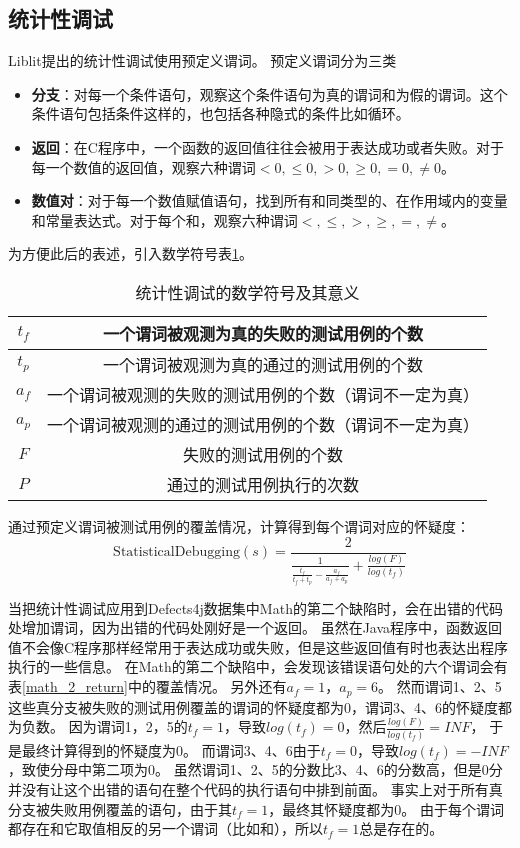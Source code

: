 \subsection{统计性调试}

Liblit\parencite{Liblit2005Scalable}提出的统计性调试使用预定义谓词。
预定义谓词分为三类
\begin{itemize}
\item \textbf{分支}：对每一个条件语句，观察这个条件语句为真的谓词和为假的谓词。这个条件语句包括条件这样的，也包括各种隐式的条件比如循环。
\item \textbf{返回}：在C程序中，一个函数的返回值往往会被用于表达成功或者失败。对于每一个数值的返回值，观察六种谓词$< 0, \le 0, > 0, \ge 0, = 0, \ne 0$。
\item \textbf{数值对}：对于每一个数值赋值语句，找到所有和同类型的、在作用域内的变量和常量表达式。对于每个和，观察六种谓词$<, \le, >, \ge, =, \ne$。
\end{itemize}
为方便此后的表述，引入数学符号表\ref{state_symbol}。
\begin{table}
\centering
\begin{tabular}{|c|c|}
\hline
$t_f$ & 一个谓词被观测为真的失败的测试用例的个数 \\
\hline
$t_p$ & 一个谓词被观测为真的通过的测试用例的个数 \\
\hline
$a_f$ & 一个谓词被观测的失败的测试用例的个数（谓词不一定为真）\\
\hline
$a_p$ & 一个谓词被观测的通过的测试用例的个数（谓词不一定为真）\\
\hline
$F$ & 失败的测试用例的个数 \\
\hline
$P$ & 通过的测试用例执行的次数 \\
\hline
\end{tabular}
\caption{统计性调试的数学符号及其意义}
\label{state_symbol}
\end{table}

通过预定义谓词被测试用例的覆盖情况，计算得到每个谓词对应的怀疑度：
\begin{equation}
\mathrm{StatisticalDebugging}(s) = \frac{2}{\frac{1}{\frac{t_f}{t_f + t_p} - \frac{a_f}{a_f + a_p}} + \frac{log(F)}{log(t_f)}}\label{eq:sd}
\end{equation}

当把统计性调试应用到Defects4j数据集中Math的第二个缺陷时，会在出错的代码处增加谓词，因为出错的代码处刚好是一个返回。
虽然在Java程序中，函数返回值不会像C程序那样经常用于表达成功或失败，但是这些返回值有时也表达出程序执行的一些信息。
在Math的第二个缺陷中，会发现该错误语句处的六个谓词会有表\ref{math_2_return}中的覆盖情况。
另外还有$a_f = 1$，$a_p = 6$。
然而谓词1、2、5这些真分支被失败的测试用例覆盖的谓词的怀疑度都为0，谓词3、4、6的怀疑度都为负数。
因为谓词1，2，5的$t_f = 1$，导致$log(t_f) = 0$，然后$\frac{log(F)}{log(t_f)} = INF$，
于是最终计算得到的怀疑度为0。
而谓词3、4、6由于$t_f = 0$，导致$log(t_f) = -INF$，致使分母中第二项为0。
虽然谓词1、2、5的分数比3、4、6的分数高，但是0分并没有让这个出错的语句在整个代码的执行语句中排到前面。
事实上对于所有真分支被失败用例覆盖的语句，由于其$t_f = 1$，最终其怀疑度都为0。
由于每个谓词都存在和它取值相反的另一个谓词（比如和），所以$t_f = 1$总是存在的。

